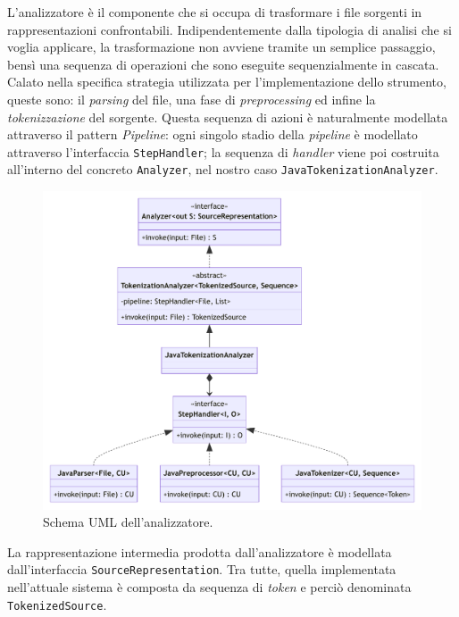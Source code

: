 L'analizzatore è il componente che si occupa di trasformare i file sorgenti in rappresentazioni confrontabili.
%
Indipendentemente dalla tipologia di analisi che si voglia applicare, la trasformazione non avviene tramite un semplice passaggio, bensì una sequenza di operazioni che sono eseguite sequenzialmente in cascata.
%
Calato nella specifica strategia utilizzata per l'implementazione dello strumento, queste sono: il \textit{parsing} del file, una fase di \textit{preprocessing} ed infine la \textit{tokenizzazione} del sorgente.
%
Questa sequenza di azioni è naturalmente modellata attraverso il pattern \textit{Pipeline}: ogni singolo stadio della \textit{pipeline} è modellato attraverso l'interfaccia \texttt{StepHandler}; la sequenza di \textit{handler} viene poi costruita all'interno del concreto \texttt{Analyzer}, nel nostro caso \texttt{JavaTokenizationAnalyzer}.
%
%

\begin{figure}[h!]
    \centering
    \includegraphics[width=\textwidth]{resources/img/02-analyzer.pdf}
    \caption{Schema UML dell'analizzatore.}
    \label{img:02-analyzer}
\end{figure}

La rappresentazione intermedia prodotta dall'analizzatore è modellata dall'interfaccia \texttt{SourceRepresentation}. 
%
Tra tutte, quella implementata nell'attuale sistema è composta da sequenza di \textit{token} e perciò denominata \texttt{TokenizedSource}.

